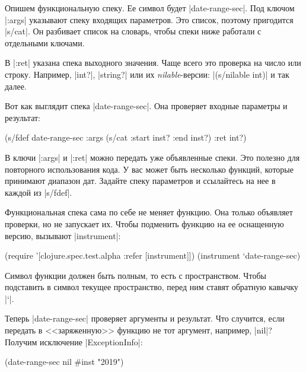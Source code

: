 Опишем функциональную спеку. Ее символ будет \spverb|date-range-sec|. Под ключом
\spverb|:args| указывают спеку входящих параметров. Это список, поэтому пригодится
\spverb|s/cat|. Он разбивает список на словарь, чтобы спеки ниже работали
с отдельными ключами.

В \spverb|:ret| указана спека выходного значения. Чаще всего это проверка на число
или строку. Например, \spverb|int?|, \spverb|string?| или их \emph{nilable}-версии:
\spverb|(s/nilable int)| и так далее.

Вот как выглядит спека \spverb|date-range-sec|. Она проверяет входные параметры
и результат:

\begin{english}
  \begin{clojure}
(s/fdef date-range-sec
  :args (s/cat :start inst? :end inst?)
  :ret int?)
  \end{clojure}
\end{english}

В ключи \spverb|:args| и \spverb|:ret| можно передать уже объявленные спеки. Это
полезно для повторного использования кода. У вас может быть несколько функций,
которые принимают диапазон дат. Задайте спеку параметров и ссылайтесь на нее в
каждой из \spverb|s/fdef|.

Функциональная спека сама по себе не меняет функцию. Она только объявляет проверки,
но не запускает их. Чтобы подменить функцию на ее оснащенную версию, вызывают
\spverb|instrument|:

\begin{english}
  \begin{clojure}
(require '[clojure.spec.test.alpha :refer [instrument]])
(instrument `date-range-sec)
  \end{clojure}
\end{english}

Символ функции должен быть полным, то есть с пространством. Чтобы подставить в
символ текущее пространство, перед ним ставят обратную кавычку \spverb|`|.

Теперь \spverb|date-range-sec| проверяет аргументы и результат. Что
случится, если передать в <<заряженную>> функцию не тот аргумент, например,
\spverb|nil|? Получим исключение \spverb|ExceptionInfo|:

\begin{english}
  \begin{clojure}
(date-range-sec nil #inst "2019")
  \end{clojure}
\end{english}

